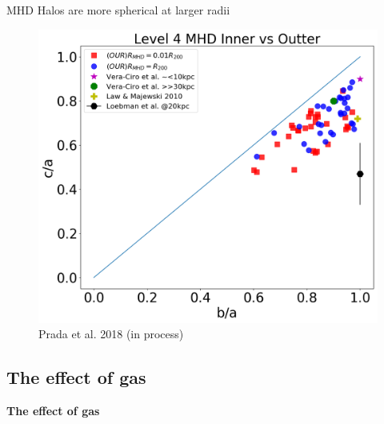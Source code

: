 \documentclass[xcolor=dvipsnames]{beamer}
\begin{document}
\begin{frame}

\centering
MHD Halos are more spherical at larger radii
\begin{figure}[!ht]
  \centering
  \includegraphics[width=0.6\columnwidth]{./pics/Triaxiality_MHD_lvl4.png}
  \caption{\tiny Prada et al. 2018 (in process)}
  \hfill

\end{figure}
\normalsize

\end{frame}

\subsection{The effect of gas}
\begin{frame}
\centering
\LARGE
\textbf{The effect of gas}
\normalsize
\end{frame}
\end{document}

